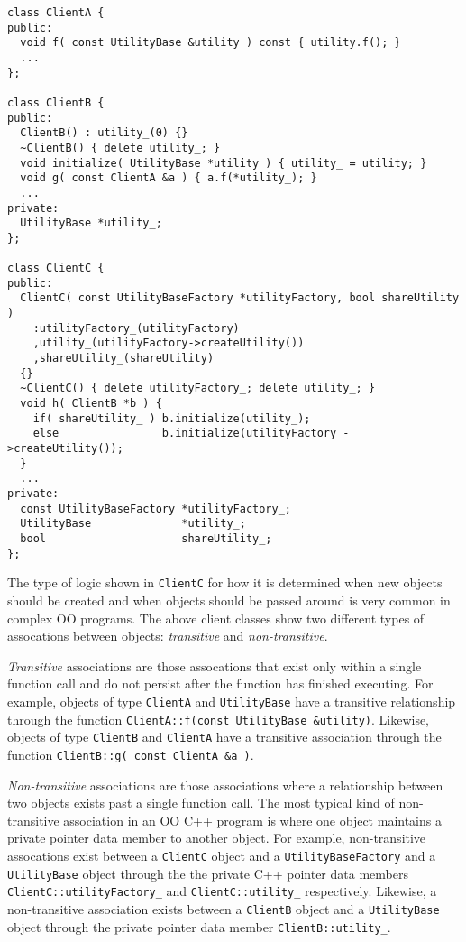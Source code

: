 \documentclass[pdf,ps2pdf,11pt]{SANDreport}
\begin{document}
{\small\begin{verbatim}
class ClientA {
public:
  void f( const UtilityBase &utility ) const { utility.f(); }
  ...
};

class ClientB {
public:
  ClientB() : utility_(0) {}
  ~ClientB() { delete utility_; }
  void initialize( UtilityBase *utility ) { utility_ = utility; }
  void g( const ClientA &a ) { a.f(*utility_); }
  ...
private:
  UtilityBase *utility_;
};

class ClientC {
public:
  ClientC( const UtilityBaseFactory *utilityFactory, bool shareUtility )
    :utilityFactory_(utilityFactory)
    ,utility_(utilityFactory->createUtility())
    ,shareUtility_(shareUtility)
  {}
  ~ClientC() { delete utilityFactory_; delete utility_; }
  void h( ClientB *b ) {
    if( shareUtility_ ) b.initialize(utility_);
    else                b.initialize(utilityFactory_->createUtility());
  }
  ...
private:
  const UtilityBaseFactory *utilityFactory_;
  UtilityBase              *utility_;
  bool                     shareUtility_;
};
\end{verbatim}}

The type of logic shown in {}\texttt{ClientC} for how it is determined
when new objects should be created and when objects should be passed
around is very common in complex OO programs.  The above client
classes show two different types of assocations between objects:
{}\textit{transitive} and {}\textit{non-transitive}.

{}\textit{Transitive} associations are those assocations that exist
only within a single function call and do not persist after the
function has finished executing.  For example, objects of type
{}\texttt{Client\-A} and {}\texttt{Utility\-Base} have a transitive
relationship through the function {}\texttt{ClientA\-::f(const
UtilityBase \&utility)}.  Likewise, objects of type
{}\texttt{Client\-B} and {}\texttt{Client\-A} have a transitive
association through the function {}\texttt{ClientB\-::g( const ClientA
\&a )}.

{}\textit{Non-transitive} associations are those associations where a
relationship between two objects exists past a single function call.
The most typical kind of non-transitive association in an OO C++
program is where one object maintains a private pointer data member to
another object.  For example, non-transitive assocations exist between
a {}\texttt{ClientC} object and a {}\texttt{Utility\-Base\-Factory}
and a {}\texttt{Utility\-Base} object through the the private C++
pointer data members {}\texttt{ClientC\-::utility\-Factory\_} and
{}\texttt{ClientC\-::utility\_} respectively.  Likewise, a
non-transitive association exists between a {}\texttt{ClientB} object
and a {}\texttt{Utility\-Base} object through the private pointer data
member {}\texttt{ClientB\-::utility\_}.
\end{document}
